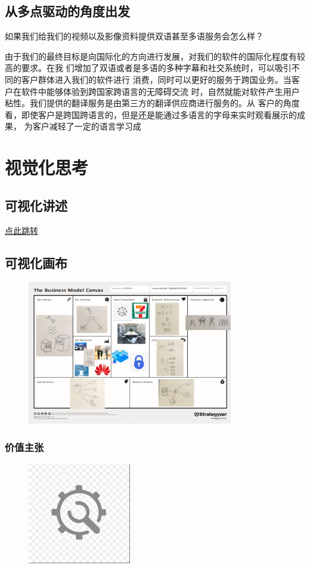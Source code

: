 \documentclass[a4paper,12pt]{article}
\begin{document}
    \subsection{从多点驱动的角度出发}
    如果我们给我们的视频以及影像资料提供双语甚至多语服务会怎么样？

    由于我们的最终目标是向国际化的方向进行发展，对我们的软件的国际化程度有较高的要求。在我 们增加了双语或者是多语的多种字幕和社交系统时，可以吸引不同的客户群体进入我们的软件进行 消费，同时可以更好的服务于跨国业务。当客户在软件中能够体验到跨国家跨语言的无障碍交流 时，自然就能对软件产生用户粘性。我们提供的翻译服务是由第三方的翻译供应商进行服务的。从 客户的角度看，即使客户是跨国跨语言的，但是还是能通过多语言的字母来实时观看展示的成果， 为客户减轻了一定的语言学习成
    \section{视觉化思考}
    \subsection{可视化讲述}
    \href{https://www.bilibili.com/video/BV16N4y1s7oL/?spm_id_from=333.999.0.0&vd_source=58029dc7b74dba0971cf73407c5f9a5e}{点此跳转}

    
    \subsection{可视化画布}
    \begin{figure}[H]
        \centering
        \includegraphics[width=0.8\textwidth]{可视化画布.png}
    \end{figure}
    \subsubsection{价值主张}
    \begin{figure}[H]
        \centering
        \includegraphics[width=0.4\textwidth]{可定制性.png}
    \end{figure}
\end{document}
